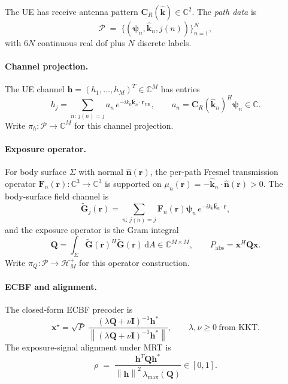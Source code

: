 \documentclass[11pt,a4paper]{article}
\theoremstyle{definition}
\newcommand{\rr}{\mathbf{r}}
\newcommand{\xx}{\mathbf{x}}
\newcommand{\hh}{\mathbf{h}}
\newcommand{\nh}{\hat{\mathbf{n}}}
\newcommand{\kh}{\hat{\mathbf{k}}}
\newcommand{\Q}{\mathbf{Q}}
\newcommand{\Gt}{\widetilde{\mathbf{G}}}
\newcommand{\F}{\mathbf{F}}
\newcommand{\Cp}{\mathbf{C}}
\newcommand{\psib}{\boldsymbol{\psi}}
\newcommand{\Sigmaset}{\Sigma}
\newcommand{\C}{\mathbb{C}}
\newcommand{\lammax}{\lambda_{\max}}
\newcommand{\diff}{\mathrm{d}}
\newcommand{\norm}[1]{\left\lVert #1 \right\rVert}
\begin{document}
The UE has receive antenna pattern $\Cp_R(\kh)\in\C^2$. The
\emph{path data} is
\[
  \mathcal{P} \;=\; \{(\psib_n,\kh_n,j(n))\}_{n=1}^N,
\]
with $6N$ continuous real dof plus $N$ discrete labels.

\paragraph{Channel projection.} The UE channel
$\hh = (h_1,\dots,h_M)^T \in \C^M$ has entries
\begin{equation}
  h_j = \sum_{n:\,j(n)=j}
        a_n\,e^{-ik_0\kh_n\cdot\rr_{\mathrm{UE}}},
  \qquad
  a_n = \Cp_R(\kh_n)^H\psib_n \in \C.
  \label{eq:h-def}
\end{equation}
Write $\pi_h:\mathcal{P}\to\C^M$ for this channel projection.

\paragraph{Exposure operator.}
For body surface $\Sigmaset$ with normal $\nh(\rr)$, the per-path
Fresnel transmission operator $\F_n(\rr):\C^3\to\C^3$ is supported on
$\mu_n(\rr)=-\kh_n\cdot\nh(\rr)>0$. The body-surface field channel is
\begin{equation}
  \Gt_j(\rr) = \sum_{n:\,j(n)=j}\F_n(\rr)\psib_n\,
               e^{-ik_0\kh_n\cdot\rr},
\end{equation}
and the exposure operator is the Gram integral
\begin{equation}
  \Q = \int_{\Sigmaset}\Gt(\rr)^H\Gt(\rr)\,\diff A
     \in\C^{M\times M},
  \qquad P_{\mathrm{abs}} = \xx^H\Q\xx.
  \label{eq:Q-def}
\end{equation}
Write $\pi_Q:\mathcal{P}\to\mathcal{H}_M^+$ for this operator
construction.

\paragraph{ECBF and alignment.}
The closed-form ECBF precoder is
\begin{equation}
  \xx^\star = \sqrt{P}\;
              \frac{(\lambda\Q+\nu\mathbf{I})^{-1}\hh^*}
                   {\norm{(\lambda\Q+\nu\mathbf{I})^{-1}\hh^*}},
  \qquad \lambda,\nu\ge 0\ \text{from KKT.}
  \label{eq:ecbf}
\end{equation}
The exposure-signal alignment under MRT is
\begin{equation}
  \rho \;=\; \frac{\hh^T\Q\hh^*}{\norm{\hh}^2\,\lammax(\Q)} \in [0,1].
  \label{eq:rho-def}
\end{equation}
\end{document}
